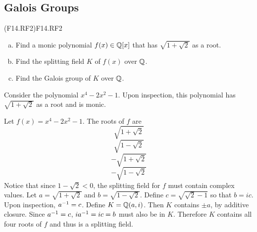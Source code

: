 \documentclass[../AlgebraQualSolutions.tex]{subfiles}
\begin{document}
\subsection{Galois Groups}

\begin{prob}{(F14.RF2)}{F14.RF2}
	\begin{enumerate}[(a)]
		\item Find a monic polynomial $f(x) \in \mathbb{Q}[x]$ that has $\sqrt{1 + \sqrt2}$ as a root.
		\item Find the splitting field $K$ of $f(x)$ over $\mathbb{Q}$.
		\item Find the Galois group of $K$ over $\mathbb{Q}$.
	\end{enumerate}
\end{prob}

\begin{solution}
	Consider the polynomial $x^4 - 2x^2 - 1$. Upon inspection, this polynomial has $\sqrt{1 + \sqrt2}$ as a root and is monic.
\end{solution}

\begin{solution}
	Let $f(x) = x^4 - 2x^2 - 1$. The roots of $f$ are
		\[\sqrt{1 + \sqrt2}\]
		\[\sqrt{1 - \sqrt2}\]
		\[-\sqrt{1 + \sqrt2}\]
		\[-\sqrt{1 - \sqrt2}\]
	Notice that since $1 - \sqrt2<0$, the splitting field for $f$ must contain complex values. Let $a = \sqrt{1 + \sqrt2}$ and $b = \sqrt{1 - \sqrt2}$. Define $c = \sqrt{\sqrt2 - 1}$ so that $b = ic$. Upon inspection, $a^{-1} = c$. Define $K = \mathbb{Q}(a, i)$. Then $K$ contains $\pm a$, by additive closure. Since $a^{-1} = c$, $i a^{-1} = ic = b$ must also be in $K$. Therefore $K$ contains all four roots of $f$ and thus is a splitting field.
\end{solution}
\end{document}
